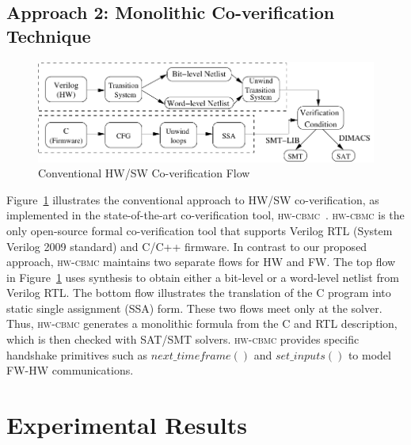 \documentclass[sigconf]{acmart}
\newcommand{\tool}[1]{\textsc{#1}\xspace}
\newcommand{\hwcbmcv}{\tool{hw-cbmc}}
\newcommand{\Omit}[1]{}
\begin{document}
\subsection{Approach 2: Monolithic Co-verification Technique}
%
\begin{figure}[t]
\begin{center}
\includegraphics[scale=0.6]{figures/traditional_flow.pdf}
\caption{Conventional HW/SW Co-verification Flow}
\label{fig:conventional}
\end{center}
\end{figure}

Figure~\ref{fig:conventional} illustrates the conventional approach to HW/SW
co-veri\-fi\-cation, as implemented in the state-of-the-art co-verification
tool, \hwcbmcv~\cite{CKY03,vlsid13}.  \hwcbmcv is the only open-source
formal co-verification tool that supports Verilog RTL (System Verilog 2009
standard) and C/C++ firmware.  In contrast to our proposed approach,
\hwcbmcv maintains two separate flows for HW and FW.  The top flow in
Figure~\ref{fig:conventional} uses synthesis to obtain either a bit-level or
a word-level netlist from Verilog RTL.  The bottom flow illustrates the
translation of the C program into static single assignment (SSA) form. 
These two flows meet only at the solver.  Thus, \hwcbmcv generates a
monolithic formula from the C and RTL description, which is then checked
with SAT/SMT solvers.  \hwcbmcv provides specific handshake primitives such
as $next\_timeframe()$ and $set\_inputs()$ to model FW-HW communications.
%
\Omit{
The hardware and firmware run independently of each other. 
The communication between them takes place through these function calls. 
}
\section{Experimental Results}
\end{document}
